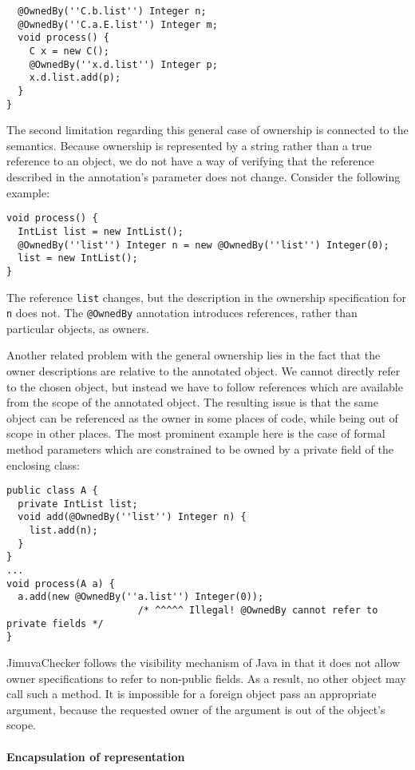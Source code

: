 \documentclass{pracamgr}
\theoremstyle{all}
\begin{document}
\begin{itemize}
\begin{lstlisting}
  @OwnedBy(''C.b.list'') Integer n;   
  @OwnedBy(''C.a.E.list'') Integer m; 
  void process() {
    C x = new C();
    @OwnedBy(''x.d.list'') Integer p;
    x.d.list.add(p);
  }  
}
  \end{lstlisting}
\end{itemize}

The second limitation regarding this general case of ownership is
connected to the semantics. Because ownership is represented by a
string rather than a true reference to an object, we do not have a way
of verifying that the reference described in the annotation's
parameter does not change. Consider the following example:
\begin{lstlisting}
void process() {
  IntList list = new IntList();
  @OwnedBy(''list'') Integer n = new @OwnedBy(''list'') Integer(0);
  list = new IntList();
}
\end{lstlisting}
The reference \texttt{list} changes, but the description in the
ownership specification for \texttt{n} does not. The \texttt{@OwnedBy}
annotation introduces references, rather than particular objects, as
owners. 

Another related problem with the general ownership lies in the fact
that the owner descriptions are relative to the annotated object. We
cannot directly refer to the chosen object, but instead we have to
follow references which are available from the scope of the annotated
object. The resulting issue is that the same object can be referenced
as the owner in some places of code, while being out of scope in other
places. The most prominent example here is the case of formal method
parameters which are constrained to be owned by a private field of the
enclosing class:
\begin{lstlisting}
public class A {
  private IntList list;
  void add(@OwnedBy(''list'') Integer n) {
    list.add(n);
  }
}
...
void process(A a) {
  a.add(new @OwnedBy(''a.list'') Integer(0)); 
                       /* ^^^^^ Illegal! @OwnedBy cannot refer to private fields */
}
\end{lstlisting}
JimuvaChecker follows the visibility mechanism of Java in that it does
not allow owner specifications to refer to non-public fields.  As a
result, no other object may call such a method. It is impossible for a
foreign object pass an appropriate argument, because the requested
owner of the argument is out of the object's scope.


\paragraph{Encapsulation of representation} $\quad$ \\
\end{document}
